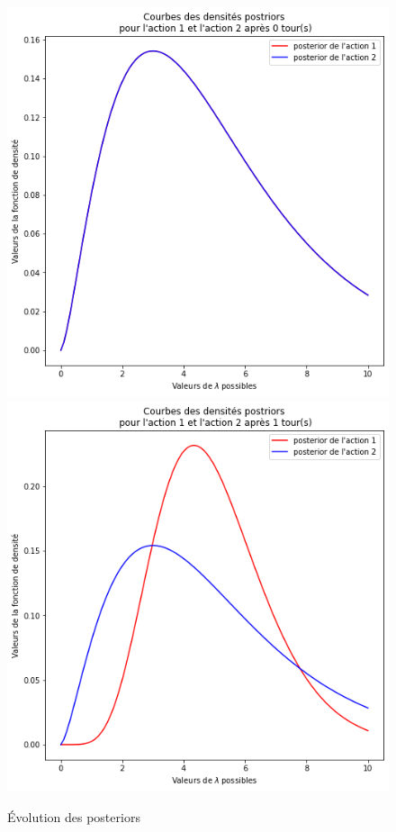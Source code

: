 \documentclass[letterpaper,11pt]{article}
\begin{document}
\begin{figure}[H]
\caption{Évolution des posteriors}
\label{figure: évolution des posteriors}
\begin{center}

\includegraphics[scale=0.45]{posterior_tour0.png} \hfill \includegraphics[scale=0.45]{posterior_tour1.png}


\end{center}
\end{figure}
\end{document}
